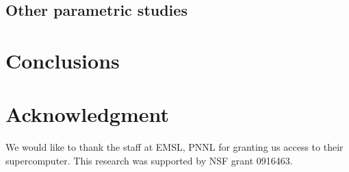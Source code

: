 \documentclass[10pt,journal,letterpaper,compsoc]{IEEEtran}
\begin{document}
\subsection{Other parametric studies}

\section{Conclusions}
\label{secConclusions}



\section*{Acknowledgment}
We would like to thank the staff at EMSL, PNNL for granting us access to their supercomputer. This research was supported by NSF grant 0916463.





%
%
%

\end{document}
